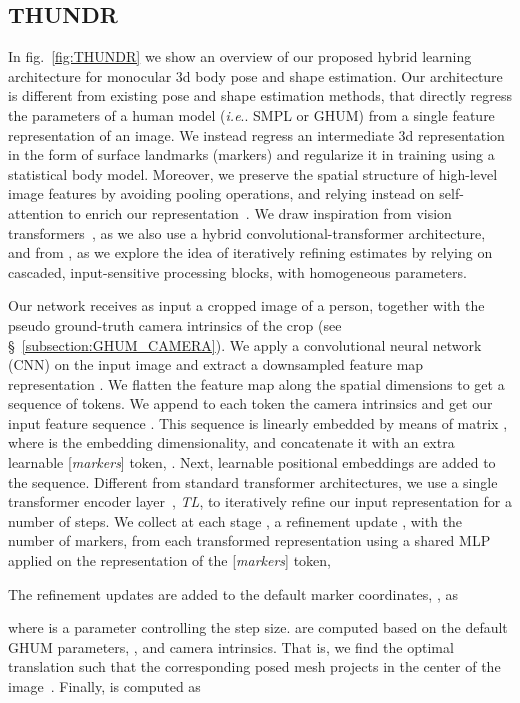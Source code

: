 \documentclass[10pt,twocolumn,letterpaper]{article}
\makeatletter
\DeclareRobustCommand\onedot{\futurelet\@let@token\@onedot}
\def\@onedot{\ifx\@let@token.\else.\null\fi\xspace}
\def\ie{\emph{i.e}\onedot} \def\Ie{\emph{I.e}\onedot}
\makeatother
\begin{document}
\subsection {THUNDR}

In fig.~\ref{fig:THUNDR} we show an overview of our proposed hybrid learning architecture for monocular 3d body pose and shape estimation. Our architecture is different from existing pose and shape estimation methods, that directly regress the parameters of a human model (\ie SMPL or GHUM) from a single feature representation of an image. We instead regress an intermediate 3d representation in the form of surface landmarks (markers) and regularize it in training using a statistical body model. Moreover, we preserve the spatial structure of high-level image features by avoiding pooling operations, and relying instead on self-attention to enrich our representation~\cite{Vaswani2017}. We draw inspiration from vision transformers~\cite{dosovitskiy2020image}, as we also use a hybrid convolutional-transformer architecture, and from \cite{zanfir2020neural}, as we explore the idea of iteratively refining estimates by relying on cascaded, input-sensitive processing blocks, with homogeneous parameters. 

Our network receives as input a cropped image  of a person, together with the pseudo ground-truth camera intrinsics  of the crop (see \S~\ref{subsection:GHUM_CAMERA}). We apply a convolutional neural network (CNN) on the input image and extract a downsampled feature map representation . We flatten the feature map along the spatial dimensions to get a sequence of  tokens. We append to each token the camera intrinsics and get our input feature sequence . This sequence is linearly embedded by means of matrix , where  is the embedding dimensionality, and concatenate it with an extra learnable [\textit{markers}] token, . Next, learnable positional embeddings  are added to the sequence. Different from standard transformer architectures, we use a single transformer encoder layer~\cite{Vaswani2017}, \textit{TL}, to iteratively refine our input representation for a number of  steps. We collect at each stage , a refinement update , with  the number of markers, from each transformed representation  using a shared MLP applied on the representation of the [\textit{markers}] token,  

The refinement updates  are added to the default marker coordinates, , as

\noindent where  is a parameter controlling the step size.  are computed based on the default GHUM parameters, , and camera intrinsics. That is, we find the optimal translation  such that the corresponding posed mesh projects in the center of the image~\cite{zanfir2020neural}. Finally,  is computed as
\end{document}
